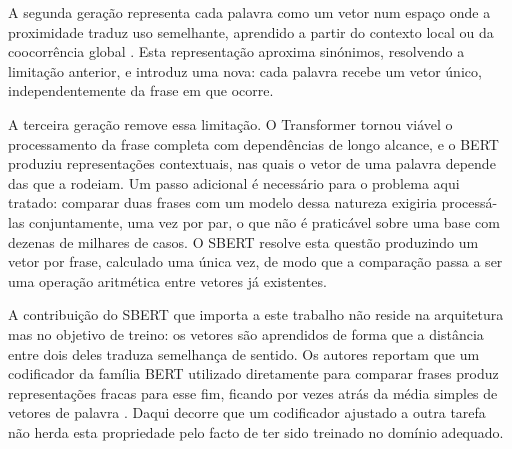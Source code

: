 A segunda geração representa cada palavra como um vetor num espaço onde a proximidade traduz uso
semelhante, aprendido a partir do contexto local \autocite{mikolov2013word2vec} ou da coocorrência
global \autocite{pennington2014glove}. Esta representação aproxima sinónimos, resolvendo a limitação
anterior, e introduz uma nova: cada palavra recebe um vetor único, independentemente da frase em
que ocorre.

A terceira geração remove essa limitação. O Transformer \autocite{vaswani2017attention} tornou
viável o processamento da frase completa com dependências de longo alcance, e o \gls{BERT}
\autocite{devlin2019bert} produziu representações contextuais, nas quais o vetor de uma palavra
depende das que a rodeiam. Um passo adicional é necessário para o problema aqui tratado: comparar
duas frases com um modelo dessa natureza exigiria processá-las conjuntamente, uma vez por par, o
que não é praticável sobre uma base com dezenas de milhares de casos. O \gls{SBERT}
\autocite{reimers2019sbert} resolve esta questão produzindo um vetor por frase, calculado uma única
vez, de modo que a comparação passa a ser uma operação aritmética entre vetores já existentes.

A contribuição do \gls{SBERT} que importa a este trabalho não reside na arquitetura mas no objetivo
de treino: os vetores são aprendidos de forma que a distância entre dois deles traduza semelhança
de sentido. Os autores reportam que um codificador da família \gls{BERT} utilizado diretamente para
comparar frases produz representações fracas para esse fim, ficando por vezes atrás da média
simples de vetores de palavra \autocite{reimers2019sbert}. Daqui decorre que um codificador ajustado
a outra tarefa não herda esta propriedade pelo facto de ter sido treinado no domínio adequado.

